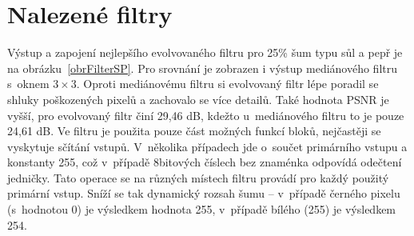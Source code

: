 \section{Nalezené filtry}
\label{secExpFilters}

Výstup a zapojení nejlepšího evolvovaného filtru pro 25\% šum typu sůl a pepř je na obrázku~\ref{obrFilterSP}. Pro srovnání je zobrazen i výstup mediánového filtru s~oknem $3\times3$. Oproti mediánovému filtru si evolvovaný filtr lépe poradil se shluky poškozených pixelů a zachovalo se více detailů. Také hodnota PSNR je vyšší, pro evolvovaný filtr činí 29,46 dB, kdežto u~mediánového filtru to je pouze 24,61 dB. Ve filtru je použita pouze část možných funkcí bloků, nejčastěji se vyskytuje sčítání vstupů. V~několika případech jde o~součet primárního vstupu a konstanty 255, což v~případě 8bitových číslech bez znaménka odpovídá odečtení jedničky. Tato operace se na různých místech filtru provádí pro každý použitý primární vstup. Sníží se tak dynamický rozsah šumu -- v~případě černého pixelu (s~hodnotou 0) je výsledkem hodnota 255, v~případě bílého (255) je výsledkem 254. %

